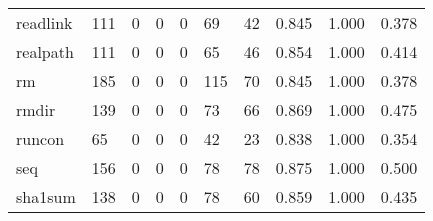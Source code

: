 \begin{longtable}{lp{2.0cm}p{2.0cm}p{2.0cm}p{2.0cm}p{2.0cm}p{2.0cm}p{2.0cm}p{2.0cm}p{2.0cm}}
readlink  &                    111 &                                             0 &                                            0 &                                           0 &                                           69 &                                         42 &                                0.845 &                                  1.000 &                                0.378 \\
realpath  &                    111 &                                             0 &                                            0 &                                           0 &                                           65 &                                         46 &                                0.854 &                                  1.000 &                                0.414 \\
rm        &                    185 &                                             0 &                                            0 &                                           0 &                                          115 &                                         70 &                                0.845 &                                  1.000 &                                0.378 \\
rmdir     &                    139 &                                             0 &                                            0 &                                           0 &                                           73 &                                         66 &                                0.869 &                                  1.000 &                                0.475 \\
runcon    &                     65 &                                             0 &                                            0 &                                           0 &                                           42 &                                         23 &                                0.838 &                                  1.000 &                                0.354 \\
seq       &                    156 &                                             0 &                                            0 &                                           0 &                                           78 &                                         78 &                                0.875 &                                  1.000 &                                0.500 \\
sha1sum   &                    138 &                                             0 &                                            0 &                                           0 &                                           78 &                                         60 &                                0.859 &                                  1.000 &                                0.435 \\

\end{longtable}
